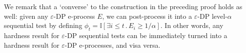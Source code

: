 \documentclass{article}
\DeclareMathOperator{\KLop}{KL}
\newcommand{\KL}[2]{%
  \mathchoice
    {\KLop\!\left(#1\,\middle\|\,#2\right)}%
    {\KLop(#1\,\Vert\,#2)}%
    {\KLop(#1\,\Vert\,#2)}%
    {\KLop(#1\,\Vert\,#2)}%
}
\newcommand{\Rdiv}[3][\eps]{%
  \mathfrak{R}_{#1}\!\left(#2\,\middle\|\,#3\right)%
}
\newcommand{\Null}{\mathbb{P}}
\newcommand{\E}{\mathbb{E}}
\newcommand{\Alt}{\mathbb{Q}}
\newcommand{\M}{\mathcal{M}}
\newcommand{\opt}{\Rdiv{\Alt}{\Null}}
\newcommand{\eps}{\varepsilon}
\begin{document}
    
    We remark that a `converse' to the construction in the preceding proof holds as well: given any $\eps$-DP e-process $E$, we can post-process it into a $\eps$-DP level-$\alpha$ sequential test by defining $\phi_t = \mathbb{I}[\exists i \leq t\,.\,E_i \geq 1/\alpha]$. In other words, any hardness result for $\eps$-DP sequential tests can be immediately turned into a hardness result for $\eps$-DP e-processes, and visa versa.


\vspace{1cm}
\end{document}
